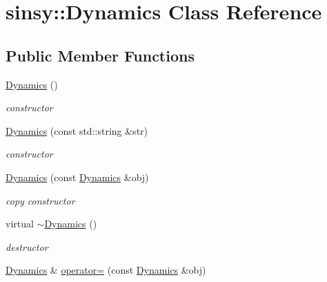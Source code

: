 \hypertarget{classsinsy_1_1Dynamics}{\section{sinsy\-:\-:\-Dynamics \-Class \-Reference}
\label{classsinsy_1_1Dynamics}
}
\subsection*{\-Public \-Member \-Functions}
\begin{DoxyCompactItemize}
\item 
\hypertarget{classsinsy_1_1Dynamics_af3e1536fbe0ac872e65d1b0d5b8867a8}{\hyperlink{classsinsy_1_1Dynamics_af3e1536fbe0ac872e65d1b0d5b8867a8}{\-Dynamics} ()}\label{classsinsy_1_1Dynamics_af3e1536fbe0ac872e65d1b0d5b8867a8}

\begin{DoxyCompactList}\small\item\em constructor \end{DoxyCompactList}\item 
\hypertarget{classsinsy_1_1Dynamics_a70063e6a07a586e38a57a56fae382661}{\hyperlink{classsinsy_1_1Dynamics_a70063e6a07a586e38a57a56fae382661}{\-Dynamics} (const std\-::string \&str)}\label{classsinsy_1_1Dynamics_a70063e6a07a586e38a57a56fae382661}

\begin{DoxyCompactList}\small\item\em constructor \end{DoxyCompactList}\item 
\hypertarget{classsinsy_1_1Dynamics_ae5cd878f576a562b3c6096d9a0ebf4f6}{\hyperlink{classsinsy_1_1Dynamics_ae5cd878f576a562b3c6096d9a0ebf4f6}{\-Dynamics} (const \hyperlink{classsinsy_1_1Dynamics}{\-Dynamics} \&obj)}\label{classsinsy_1_1Dynamics_ae5cd878f576a562b3c6096d9a0ebf4f6}

\begin{DoxyCompactList}\small\item\em copy constructor \end{DoxyCompactList}\item 
\hypertarget{classsinsy_1_1Dynamics_ad06eca3d16f785f765235effe3047bcf}{virtual \hyperlink{classsinsy_1_1Dynamics_ad06eca3d16f785f765235effe3047bcf}{$\sim$\-Dynamics} ()}\label{classsinsy_1_1Dynamics_ad06eca3d16f785f765235effe3047bcf}

\begin{DoxyCompactList}\small\item\em destructor \end{DoxyCompactList}\item 
\hypertarget{classsinsy_1_1Dynamics_ae1a0ae4764c32f96670572d592292554}{\hyperlink{classsinsy_1_1Dynamics}{\-Dynamics} \& \hyperlink{classsinsy_1_1Dynamics_ae1a0ae4764c32f96670572d592292554}{operator=} (const \hyperlink{classsinsy_1_1Dynamics}{\-Dynamics} \&obj)}\label{classsinsy_1_1Dynamics_ae1a0ae4764c32f96670572d592292554}


\end{DoxyCompactItemize}
